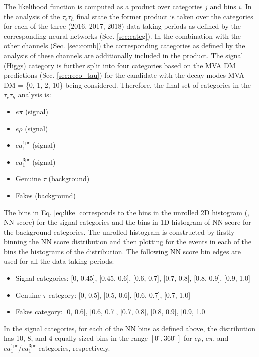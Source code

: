 The likelihood function is computed as a product over categories $j$ and bins $i$. In the analysis of the $\tau_e\tau_h$ final state the former product is taken over the categories for each of the three (2016, 2017, 2018) data-taking periods as defined by the corresponding neural networks (Sec. \ref{sec:categ}). In the combination with the other channels (Sec. \ref{sec:comb}) the corresponding categories as defined by the analysis of these channels are additionally included in the product. The signal (Higgs) category is further split into four categories based on the MVA DM predictions (Sec. \ref{sec:reco_tau}) for the \tauh candidate with the decay modes MVA DM = \{0, 1, 2, 10\} being considered. Therefore, the final set of categories in the $\tau_e\tau_h$ analysis is:
\begin{itemize}
    \item $e\pi$ (signal)
    \item $e\rho$ (signal)
    \item $e a_1^\text{1pr}$ (signal)
    \item $e a_1^\text{3pr}$ (signal)
    \item Genuine $\tau$ (background)
    \item Fakes (background)
\end{itemize}

The bins in Eq. \ref{eq:like} corresponds to the bins in the unrolled 2D histogram (\phicp, NN score) for the signal categories and the bins in 1D histogram of NN score for the background categories. The unrolled histogram is constructed by firstly binning the NN score distribution and then plotting for the events in each of the bins the histograms of the \phicp distribution. The following NN score bin edges are used for all the data-taking periods:
\begin{itemize}
    \item Signal categories: [0, 0.45], [0.45, 0.6], [0.6, 0.7], [0.7, 0.8], [0.8, 0.9], [0.9, 1.0]
    \item Genuine $\tau$ category: [0, 0.5], [0.5, 0.6], [0.6, 0.7], [0.7, 1.0]
    \item Fakes category: [0, 0.6], [0.6, 0.7], [0.7, 0.8], [0.8, 0.9], [0.9, 1.0]
\end{itemize}

In the signal categories, for each of the NN bins as defined above, the \phicp distribution has 10, 8, and 4 equally sized bins in the range $[0^\circ, 360^\circ]$ for $e\rho$, $e\pi$, and $e a_1^\text{1pr}/e a_1^\text{3pr}$ categories, respectively.

